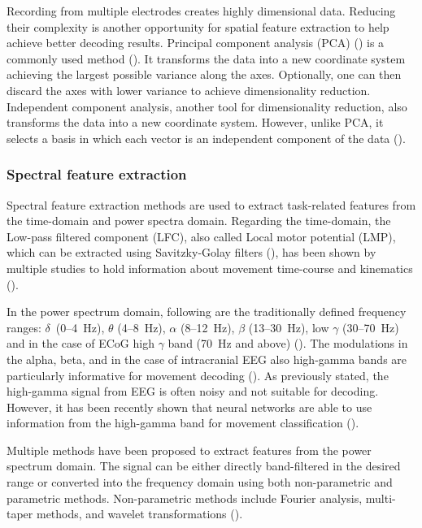 Recording from multiple electrodes creates highly dimensional data. Reducing their complexity is another opportunity for spatial feature extraction to help achieve better decoding results. Principal component analysis (PCA) (\cite{pca}) is a commonly used method (\cite{volkova-review}). It transforms the data into a new coordinate system achieving the largest possible variance along the axes. Optionally, one can then discard the axes with lower variance to achieve dimensionality reduction. Independent component analysis, another tool for dimensionality reduction, also transforms the data into a new coordinate system. 
However, unlike PCA, it selects a basis in which each vector is an independent component of the data (\cite{ica}).

\subsubsection{Spectral feature extraction}
Spectral feature extraction methods are used to extract task-related features from the time-domain and power spectra domain. Regarding the time-domain, the Low-pass filtered component (LFC), also called Local motor potential (LMP), which can be extracted using Savitzky-Golay filters (\cite{multitaper-31}), has been shown by multiple studies to hold information about movement time-course and kinematics (\cite{schalk-2007, Pistohl2008PredictionOA, ball-2019}). 

In the power spectrum domain, following are the traditionally defined frequency ranges: $\delta$~(0–4~Hz), $\theta$ (4–8~Hz), $\alpha$ (8–12~Hz), $\beta$ (13–30~Hz), low $\gamma$ (30–70~Hz) and in the case of ECoG high $\gamma$ band (70~Hz and above) (\cite{hammer-predominance-2016}). The modulations in the alpha, beta, and in the case of intracranial EEG also high-gamma bands are particularly informative for movement decoding (\cite{ball-hg-importance, 34-gunduz-hg}). As previously stated, the high-gamma signal from EEG is often noisy and not suitable for decoding. However, it has been recently shown that neural networks are able to use information from the high-gamma band for movement classification (\cite{schirrmeister-deep-2017}).

Multiple methods have been proposed to extract features from the power spectrum domain.
The signal can be either directly band-filtered in the desired range or converted into the frequency domain using both non-parametric and parametric methods.
Non-parametric methods include Fourier analysis, multi-taper methods, and wavelet transformations (\cite{volkova-review}).

